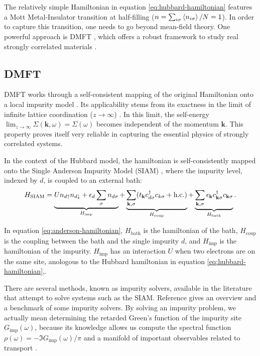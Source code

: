 \documentclass[12pt]{report}
\begin{document}
The relatively simple Hamiltonian in equation \ref{eq:hubbard-hamiltonian} features a Mott Metal-Insulator transition at half-filling ($n = \sum_{i\s} \ev{n_{i\s}} / N = 1$). In order to capture this transition, one needs to go beyond mean-field theory. One powerful approach is DMFT \cite{georges1996}, which offers a robust framework to study real strongly correlated materials \cite{haule_real_materials}.

\subsection{DMFT} \label{sec:dmft}

DMFT works through a self-consistent mapping of the original Hamiltonian onto a local impurity model \cite{thesis_dmft_graz}. Its applicability stems from its exactness in the limit of infinite lattice coordination ($z \to \infty$) \cite{georges1996}. In this limit, the self-energy $\displaystyle{\lim_{z \to \infty}\Sigma(\mathbf{k},\omega) = \Sigma(\omega)}$ becomes independent of the momentum $\mathbf{k}$. This property proves itself very reliable in capturing the essential physics of strongly correlated systems.

In the context of the Hubbard model, the hamiltonian is self-consistently mapped onto the Single Anderson Impurity Model (SIAM) \cite{impurity-solvers, georges1996}, where the impurity level, indexed by $d$, is coupled to an external bath:
\begin{equation} \label{eq:anderson-hamiltonian}
H_{\text{SIAM}} = \underbrace{U n_{d{\uparrow}} n_{d{\downarrow}} + \epsilon_d \sum_{{\sigma}} n_{d{\sigma}}}_{H_{\text{imp}}}
+ \underbrace{\sum_{{\vb{k}},{\sigma}} (t_{\vb{k}} c_{d{\sigma}}^\dagger c_{k{\sigma}} + {\text{h.c.}})}_{H_{\text{coup}}}
+ \underbrace{\sum_{{\vb{k}},{\sigma}} \epsilon_{\vb{k}} c_{{\vb{k}}{\sigma}}^\dagger c_{{\vb{k}}{\sigma}}}_{H_{\text{bath}}}.
\end{equation}

In equation \ref{eq:anderson-hamiltonian}, $H_{\text{bath}}$ is the hamiltonian of the bath, $H_{\text{coup}}$ is the coupling between the bath and the single impurity $d$, and $H_{\text{imp}}$ is the hamiltonian of the impurity. $H_{\text{imp}}$  has an interaction $U$ when two electrons are on the same site, anologous to the Hubbard hamiltonian in equation \ref{eq:hubbard-hamiltonian},.

There are several methods, known as impurity solvers, available in the literature that attempt to solve systems such as the SIAM. Reference \cite{impurity-solvers} gives an overview and a benchmark of some impurity solvers. By solving an impurity problem, we actually mean determining the retarded Green's function of the impurity site $G_{\text{imp}}(\omega)$, because its knowledge allows us compute the spectral function $\displaystyle{\rho(\omega) = - \Im{G_{\text{imp}}(\omega)}} / \pi$ and a manifold of important observables related to transport \cite{pedagogical-gfs}.
\end{document}
